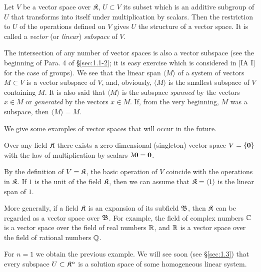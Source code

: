 \begin{definition}
	Let $V$ be a vector space over ${\mathfrak{K}}$, $U\subset V$ its subset which is an additive subgroup of $U$ that transforms into itself under multiplication by scalars. Then the restriction to $U$ of the operations defined on $V$ gives $U$ the structure of a vector space. It is called a \textit{vector} (or \textit{linear}) \textit{subspace} of $V$.
\end{definition}

The intersection of any number of vector spaces is also a vector subspace (see the beginning of Para. 4 of \S\ref{sec:1.1-2}; it is easy exercise which is considered in [IA I] for the case of groups). We see that the linear span $\langle M\rangle$ of a system of vectors $M\subset V$ is a vector subspace of $V$, and, obviously, $\langle M\rangle$ is the smallest subspace of $V$ containing $M$. It is also said that $\langle M\rangle$ is the subspace \textit{spanned} by the vectors $x\in M$ or \textit{generated} by the vectors $x\in M$. If, from the very beginning, $M$ was a subspace, then $\langle M\rangle = M$.

We give some examples of vector spaces that will occur in the future.

\begin{example}
	Over any field ${\mathfrak{K}}$ there exists a zero-dimensional (singleton) vector space $V = \{\v0\}$ with the law of multiplication by scalars $\lambda \v0 = \v0$.
\end{example}

\begin{example}\label{ex:base-field-space}
	By the definition of $V={\mathfrak{K}}$, the basic operation of $V$ coincide with the operations in ${\mathfrak{K}}$. If $1$ is the unit of the field ${\mathfrak{K}}$, then we can assume that ${\mathfrak{K}} = \langle 1\rangle$ is the linear span of $1$.
	
	More generally, if a field ${\mathfrak{K}}$ is an expansion of its subfield ${\mathfrak{B}}$, then ${\mathfrak{K}}$ can be regarded as a vector space over ${\mathfrak{B}}$. For example, the field of complex numbers ${\mathbb{C}}$ is a vector space over the field of real numbers ${\mathbb{R}}$, and ${\mathbb{R}}$ is a vector space over the field of rational numbers ${\mathbb{Q}}$.
\end{example}

\begin{example}
	For $n = 1$ we obtain the previous example. We will see soon (see \S\ref{sec:1.3}) that every subspace $U\subset {{\mathfrak{K}}}^n$ is a solution space of some homogeneous linear system.
\end{example}

